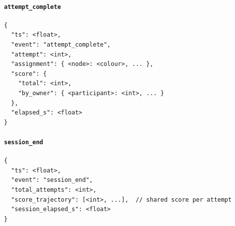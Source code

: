 \documentclass[11pt]{article}
\theoremstyle{definition}
\begin{document}
\paragraph{\texttt{attempt\_complete}}
\begin{verbatim}
{
  "ts": <float>,
  "event": "attempt_complete",
  "attempt": <int>,
  "assignment": { <node>: <colour>, ... },
  "score": {
    "total": <int>,
    "by_owner": { <participant>: <int>, ... }
  },
  "elapsed_s": <float>
}
\end{verbatim}

\paragraph{\texttt{session\_end}}
\begin{verbatim}
{
  "ts": <float>,
  "event": "session_end",
  "total_attempts": <int>,
  "score_trajectory": [<int>, ...],  // shared score per attempt
  "session_elapsed_s": <float>
}
\end{verbatim}
\end{document}
